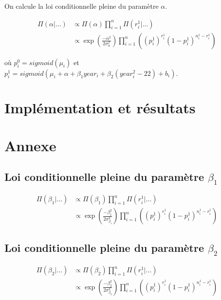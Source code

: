 \documentclass[
]{article}
\begin{document}
On calcule la loi conditionnelle pleine du paramètre \(\alpha\).

\begin{align*}
\Pi(\alpha|...) &\propto \Pi(\alpha) \prod_{i=1}^n\Pi(r_i^1|...) \\
&\propto \exp\left({\frac{-\alpha^2}{2\sigma_{\alpha}^2}}\right)\prod_{i=1}^n \left((p_i^1)^{r_i^1}(1-p_i^1)^{n_i^1-r_i^1}\right)
\end{align*}

où \(p_i^0=sigmoid(\mu_i)\) et
\(p_i^1=sigmoid(\mu_i+\alpha+\beta_1 year_i+\beta_2(year_i^2-22)+b_i)\).

\hypertarget{impluxe9mentation-et-ruxe9sultats}{%
\section{Implémentation et
résultats}\label{impluxe9mentation-et-ruxe9sultats}}

\hypertarget{annexe}{%
\section{Annexe}\label{annexe}}

\hypertarget{loi-conditionnelle-pleine-du-paramuxe8tre-beta_1}{%
\subsection{\texorpdfstring{Loi conditionnelle pleine du paramètre
\(\beta_1\)}{Loi conditionnelle pleine du paramètre \textbackslash beta\_1}}\label{loi-conditionnelle-pleine-du-paramuxe8tre-beta_1}}

\begin{align*}
\Pi(\beta_1|...) &\propto \Pi(\beta_1) \prod_{i=1}^n\Pi(r_i^1|...) \\
&\propto \exp\left({\frac{-\beta_1^2}{2\sigma_{\beta_1}^2}}\right)\prod_{i=1}^n \left((p_i^1)^{r_i^1}(1-p_i^1)^{n_i^1-r_i^1}\right)
\end{align*}

\hypertarget{loi-conditionnelle-pleine-du-paramuxe8tre-beta_2}{%
\subsection{\texorpdfstring{Loi conditionnelle pleine du paramètre
\(\beta_2\)}{Loi conditionnelle pleine du paramètre \textbackslash beta\_2}}\label{loi-conditionnelle-pleine-du-paramuxe8tre-beta_2}}

\begin{align*}
\Pi(\beta_2|...) &\propto \Pi(\beta_2) \prod_{i=1}^n\Pi(r_i^1|...) \\
&\propto \exp\left({\frac{-\beta_2^2}{2\sigma_{\beta_2}^2}}\right)\prod_{i=1}^n \left((p_i^1)^{r_i^1}(1-p_i^1)^{n_i^1-r_i^1}\right)
\end{align*}
\end{document}
